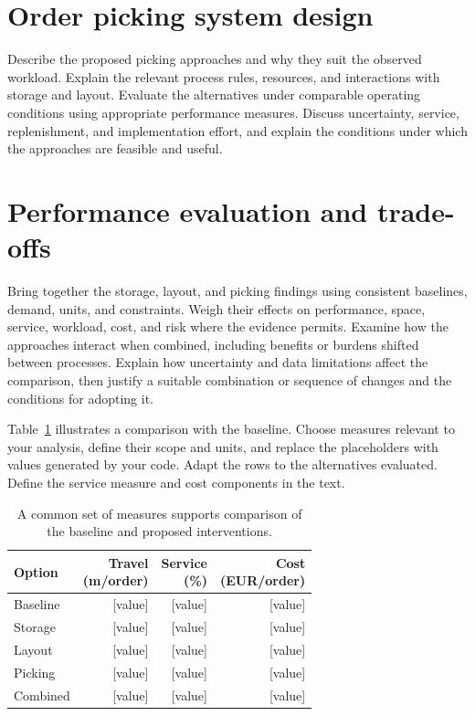 \documentclass[conference]{IEEEtran}
\begin{document}
\section{Order picking system design}
Describe the proposed picking approaches and why they suit the observed
workload. Explain the relevant process rules, resources, and interactions
with storage and layout. Evaluate the alternatives under comparable operating
conditions using appropriate performance measures. Discuss uncertainty,
service, replenishment, and implementation effort, and explain the conditions
under which the approaches are feasible and useful.

\section{Performance evaluation and trade-offs}
Bring together the storage, layout, and picking findings using consistent
baselines, demand, units, and constraints. Weigh their effects on performance,
space, service, workload, cost, and risk where the evidence permits. Examine
how the approaches interact when combined, including benefits or burdens
shifted between processes. Explain how uncertainty and data limitations affect
the comparison, then justify a suitable combination or sequence of changes
and the conditions for adopting it.

Table~\ref{tab:comparison-pattern} illustrates a comparison with the baseline.
Choose measures relevant to your analysis, define their scope and units,
and replace the placeholders with values generated by your code. Adapt the
rows to the alternatives evaluated. Define the service measure and cost
components in the text.

\begin{table}[!ht]
\caption{A common set of measures supports comparison of the baseline and proposed interventions.}
\label{tab:comparison-pattern}
\centering
\footnotesize
\setlength{\tabcolsep}{3pt}
\begin{tabular}{@{}lrrr@{}}
\toprule
Option & \shortstack{Travel\\(m/order)} & \shortstack{Service\\(\%)} & \shortstack{Cost\\(EUR/order)} \\
\midrule
Baseline & [value] & [value] & [value] \\
Storage & [value] & [value] & [value] \\
Layout & [value] & [value] & [value] \\
Picking & [value] & [value] & [value] \\
Combined & [value] & [value] & [value] \\
\bottomrule
\end{tabular}
\end{table}
\end{document}
